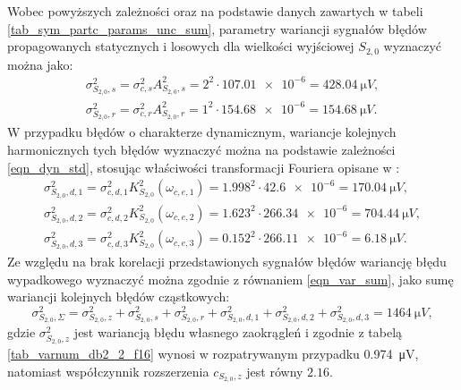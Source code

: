 Wobec powyższych zależności oraz na podstawie danych zawartych w tabeli \ref{tab_sym_partc_params_unc_sum}, parametry wariancji sygnałów błędów propagowanych statycznych i losowych dla wielkości wyjściowej $S_{2,0}$ wyznaczyć można jako:
\begin{gather}
\sigma_{S_{2,0},s}^{2} = \sigma_{c,s}^{2} A_{S_{2,0},s}^{2} = 2^{2} \cdot \num{107.01e-6} = \qty{428.04}{\micro V} \label{eqn_sym_partd_output_var_stat_S_2_0}, \\
\sigma_{S_{2,0},r}^{2} = \sigma_{c,r}^{2} A_{S_{2,0},r}^{2} = 1^{2} \cdot \num{154.68e-6} = \qty{154.68}{\micro V} \label{eqn_sym_partd_output_var_rand_S_2_0}.
\end{gather}
W przypadku błędów o charakterze dynamicznym, wariancje kolejnych harmonicznych tych błędów wyznaczyć można na podstawie zależności \eqref{eqn_dyn_std}, stosując właściwości transformacji Fouriera opisane w \cite{oppenheim_sns}:
\begin{gather}
\sigma_{S_{2,0},d,1}^{2} = \sigma_{c,d,1}^{2} K_{S_{2,0}}^{2} \left( \omega_{c,e,1} \right) = {1.998}^{2} \cdot \num{42.6e-6} = \qty{170.04}{\micro V} \label{eqn_sym_partd_output_var_dyn_1_S_2_0}, \\
\sigma_{S_{2,0},d,2}^{2} = \sigma_{c,d,2}^{2} K_{S_{2,0}}^{2}\left(\omega_{c,e,2}\right) = {1.623}^{2} \cdot \num{266.34e-6} = \qty{704.44}{\micro V} \label{eqn_sym_partd_output_var_dyn_2_S_2_0}, \\
\sigma_{S_{2,0},d,3}^{2} = \sigma_{c,d,3}^{2} K_{S_{2,0}}^{2} \left( \omega_{c,e,3} \right) = {0.152}^{2} \cdot \num{266.11e-6} = \qty{6.18}{\micro V} \label{eqn_sym_partd_output_var_dyn_3_S_2_0}.
\end{gather}
Ze względu na brak korelacji przedstawionych sygnałów błędów wariancję błędu wypadkowego wyznaczyć można zgodnie z równaniem \eqref{eqn_var_sum}, jako sumę wariancji kolejnych błędów cząstkowych:
\begin{equation}
\sigma_{S_{2,0},\Sigma}^{2} = \sigma_{S_{2,0},z}^{2} + \sigma_{S_{2,0},s}^{2} + \sigma_{S_{2,0},r}^{2} + \sigma_{S_{2,0},d,1}^{2} + \sigma_{S_{2,0},d,2}^{2} + \sigma_{S_{2,0},d,3}^{2} = \qty{1464}{\micro V} \label{eqn_sym_partd_output_var_sum_S_2_0},
\end{equation}
gdzie $\sigma_{S_{2,0},z}^{2}$ jest wariancją błędu własnego zaokrągleń i zgodnie z tabelą \ref{tab_varnum_db2_2_f16} wynosi w rozpatrywanym przypadku \qty{0.974}{\micro V}, natomiast współczynnik rozszerzenia $c_{S_{2,0},z}$ jest równy $2.16$.

